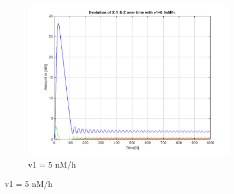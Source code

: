 \documentclass[10pt,a4paper,oneside,twocolumn]{article}
\numberwithin{equation}{section} %
\begin{document}
\begin{figure}
\begin{subfigure}[b]{0.3\textwidth}
	    \includegraphics[width=\textwidth]{LotsofthesameA/A-A5.png}
	    \caption{v1 = 5 nM/h}
	\end{subfigure}
	 

\end{figure}
\end{document}
